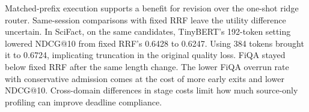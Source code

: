 Matched-prefix execution supports a benefit for revision over the one-shot ridge router. Same-session comparisons with fixed RRF leave the utility difference uncertain. In SciFact, on the same candidates, TinyBERT's 192-token setting lowered NDCG@10 from fixed RRF's 0.6428 to 0.6247. Using 384 tokens brought it to 0.6724, implicating truncation in the original quality loss. FiQA stayed below fixed RRF after the same length change. The lower FiQA overrun rate with conservative admission comes at the cost of more early exits and lower NDCG@10. Cross-domain differences in stage costs limit how much source-only profiling can improve deadline compliance.
